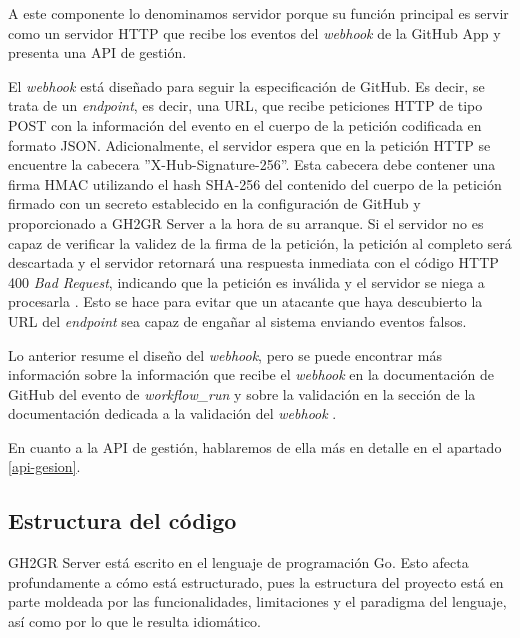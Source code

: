 A este componente lo denominamos servidor porque su función principal es servir como un servidor \acrshort{HTTP} que recibe los eventos del \textit{webhook} de la GitHub App y presenta una \acrshort{API} de gestión.

El \textit{webhook} está diseñado para seguir la especificación de GitHub. Es decir, se trata de un \textit{endpoint}, es decir, una \acrshort{URL}, que recibe peticiones \acrshort{HTTP} de tipo POST con la información del evento en el cuerpo de la petición codificada en formato \acrshort{JSON}. Adicionalmente, el servidor espera que en la petición \acrshort{HTTP} se encuentre la cabecera ''X-Hub-Signature-256''. Esta cabecera debe contener una firma \acrshort{HMAC}\cite{rfc2104} utilizando el hash SHA-256\cite{Dang2015} del contenido del cuerpo de la petición firmado con un secreto establecido en la configuración de GitHub y proporcionado a GH2GR Server a la hora de su arranque. Si el servidor no es capaz de verificar la validez de la firma de la petición, la petición al completo será descartada y el servidor retornará una respuesta inmediata con el código \acrshort{HTTP} 400 \textit{Bad Request}, indicando que la petición es inválida y el servidor se niega a procesarla \cite{rfc7231}. Esto se hace para evitar que un atacante que haya descubierto la \acrshort{URL} del \textit{endpoint} sea capaz de engañar al sistema enviando eventos falsos.

Lo anterior resume el diseño del \textit{webhook}, pero se puede encontrar más información sobre la información que recibe el \textit{webhook} en la documentación de GitHub del evento de \textit{workflow\_run} \cite{githubWebhookEvents} y sobre la validación en la sección de la documentación dedicada a la validación del \textit{webhook} \cite{githubValidatingWebhook}.

En cuanto a la \acrshort{API} de gestión, hablaremos de ella más en detalle en el apartado \ref{api-gesion}.
\subsection{Estructura del código}

GH2GR Server está escrito en el lenguaje de programación Go\cite{goProgrammingLanguage}. Esto afecta profundamente a cómo está estructurado, pues la estructura del proyecto está en parte moldeada por las funcionalidades, limitaciones y el paradigma del lenguaje, así como por lo que le resulta idiomático.

